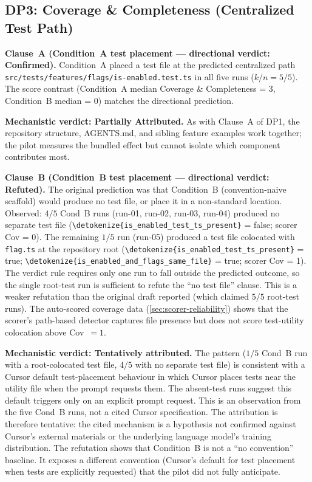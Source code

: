 \documentclass[12pt,a4paper]{report}
\newcommand{\code}[1]{\texttt{\nolinkurl{\detokenize{#1}}}}
\DeclareRobustCommand{\filename}[1]{\bgroup\urlstyle{tt}\nolinkurl{#1}\egroup}
\begin{document}
\subsection{DP3: Coverage \& Completeness (Centralized Test Path)}
\label{sec:dp3-results}

\textbf{Clause~A (Condition~A test placement — directional verdict: Confirmed).} Condition~A placed a test file at the predicted centralized path \filename{src/tests/features/flags/is-enabled.test.ts} in all five runs ($k/n = 5/5$). The score contrast (Condition~A median Coverage \& Completeness = 3, Condition~B median = 0) matches the directional prediction.

\textbf{Mechanistic verdict: Partially Attributed.} As with Clause~A of DP1, the repository structure, AGENTS.md, and sibling feature examples work together; the pilot measures the bundled effect but cannot isolate which component contributes most.

\textbf{Clause~B (Condition~B test placement — directional verdict: Refuted).} The original prediction was that Condition~B (convention-naive scaffold) would produce no test file, or place it in a non-standard location. Observed: $4/5$ Cond~B runs (run-01, run-02, run-03, run-04) produced no separate test file (\code{is\_enabled\_test\_ts\_present} = false; scorer Cov = 0). The remaining $1/5$ run (run-05) produced a test file colocated with \filename{flag.ts} at the repository root (\code{is\_enabled\_test\_ts\_present} = true; \code{is\_enabled\_and\_flags\_same\_file} = true; scorer Cov = 1). The verdict rule requires only one run to fall outside the predicted outcome, so the single root-test run is sufficient to refute the ``no test file'' clause. This is a weaker refutation than the original draft reported (which claimed $5/5$ root-test runs). The auto-scored coverage data (\autoref{sec:scorer-reliability}) shows that the scorer's path-based detector captures file presence but does not score test-utility colocation above Cov~$=1$.

\textbf{Mechanistic verdict: Tentatively attributed.} The pattern ($1/5$ Cond~B run with a root-colocated test file, $4/5$ with no separate test file) is consistent with a Cursor default test-placement behaviour in which Cursor places tests near the utility file when the prompt requests them. The absent-test runs suggest this default triggers only on an explicit prompt request. This is an observation from the five Cond~B runs, not a cited Cursor specification. The attribution is therefore tentative: the cited mechanism is a hypothesis not confirmed against Cursor's external materials or the underlying language model's training distribution. The refutation shows that Condition~B is not a ``no convention'' baseline. It exposes a different convention (Cursor's default for test placement when tests are explicitly requested) that the pilot did not fully anticipate.
\end{document}
